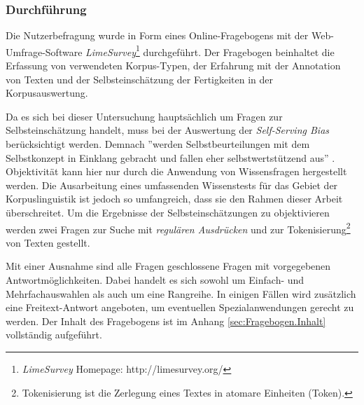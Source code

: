 
\subsubsection{Durchführung}

Die Nutzerbefragung wurde in Form eines Online-Fragebogens mit der Web-Umfrage-Software \emph{LimeSurvey}\footnote{\emph{LimeSurvey} Homepage: http://limesurvey.org/} durchgeführt. Der Fragebogen beinhaltet die Erfassung von verwendeten Korpus-Typen, der Erfahrung mit der Annotation von Texten und der Selbsteinschätzung der Fertigkeiten in der Korpusauswertung.

Da es sich bei dieser Untersuchung hauptsächlich um Fragen zur Selbsteinschätzung handelt, muss bei der Auswertung der \emph{Self-Serving Bias} berücksichtigt werden. Demnach ''werden Selbstbeurteilungen mit dem Selbstkonzept in Einklang gebracht und fallen eher selbstwertstützend aus'' \cite[][S. 183]{bortz2006methoden}. Objektivität kann hier nur durch die Anwendung von Wissensfragen hergestellt werden. Die Ausarbeitung eines umfassenden Wissenstests für das Gebiet der Korpuslinguistik ist jedoch so umfangreich, dass sie den Rahmen dieser Arbeit überschreitet. Um die Ergebnisse der Selbsteinschätzungen zu objektivieren werden zwei Fragen zur Suche mit \emph{regulären Ausdrücken} und zur Tokenisierung\footnote{Tokenisierung ist die Zerlegung eines Textes in atomare Einheiten (Token).} von Texten gestellt. 

Mit einer Ausnahme sind alle Fragen geschlossene Fragen mit vorgegebenen Antwortmöglichkeiten. Dabei handelt es sich sowohl um Einfach- und Mehrfachauswahlen als auch um eine Rangreihe. In einigen Fällen wird zusätzlich eine Freitext-Antwort angeboten, um eventuellen Spezialanwendungen gerecht zu werden. Der Inhalt des Fragebogens ist im Anhang \ref{sec:Fragebogen.Inhalt} vollständig aufgeführt. 


